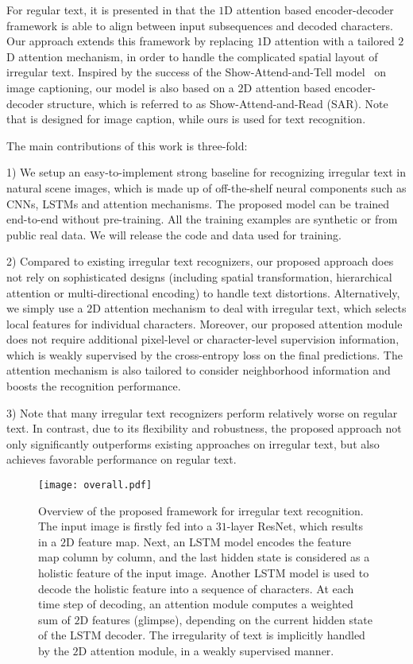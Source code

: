 \documentclass[letterpaper]{article} \usepackage{aaai19}  \usepackage{times}  \usepackage{helvet}  \usepackage{courier}  \usepackage{url}  \usepackage{graphicx}  \usepackage{amsmath}
\begin{document}
For regular text,
it is presented in \cite{Lee_2016_CVPR,shiCVPR2016} that the $1$D attention based encoder-decoder framework is able to align between input subsequences and decoded characters.
Our approach extends this framework by replacing $1$D attention with a tailored $2$D attention mechanism,
in order to handle the complicated spatial layout of irregular text.
Inspired by the success of the Show-Attend-and-Tell model~\cite{xu2015show} on image captioning,
our model is also based on a $2$D attention based encoder-decoder structure, which is referred to as Show-Attend-and-Read (SAR).
Note that \cite{xu2015show} is designed for image caption, while ours is used for text recognition.


The main contributions of this work is three-fold:

1)	We setup an easy-to-implement strong baseline for recognizing irregular text in natural scene images,
which is made up of off-the-shelf neural components such as CNNs, LSTMs and attention mechanisms.
The proposed model can be trained end-to-end without pre-training.
All the training examples are synthetic or from public real data.
We will release the code and data used for training.

2) Compared to existing irregular text recognizers, our proposed approach does not rely on sophisticated designs (including spatial transformation,
hierarchical attention or multi-directional encoding) to handle text distortions.
Alternatively, we simply use a $2$D attention mechanism to deal with irregular text, which selects local features for individual characters.
Moreover, our proposed attention module does not require additional pixel-level or character-level supervision information,
which is weakly supervised by the cross-entropy loss on the final predictions.
The attention mechanism is also tailored to consider neighborhood information and boosts the recognition performance.

3) Note that many irregular text recognizers perform relatively worse on regular text. In contrast, due to its flexibility and robustness,
the proposed approach not only significantly outperforms existing approaches on irregular text, but also achieves favorable performance on regular text.

\begin{figure*}[t]
	\begin{center}
		\texttt{[image: overall.pdf]}
	\end{center}
	\caption{ Overview of the proposed framework for irregular text recognition. The input image  is firstly fed into a $31$-layer
		ResNet, which results in a $2$D feature map. Next, an LSTM model encodes the feature map column by column, and the last hidden state is considered as a holistic feature of the input image. Another LSTM model is used to decode the holistic feature into a sequence of characters. At each time step of decoding, an attention module computes a weighted sum of $2$D features (glimpse), depending on the current hidden state of the LSTM decoder. The irregularity of text is implicitly handled by the $2$D attention module, in a weakly supervised manner.
	}
	\label{fig:framework}
\end{figure*}
\end{document}
